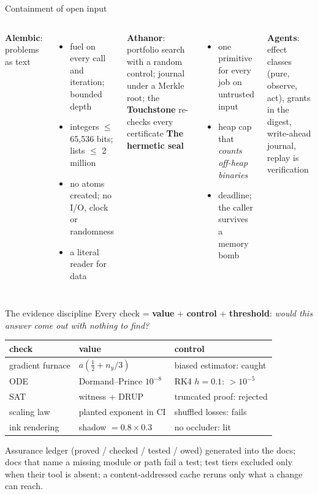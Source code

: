 \documentclass[aspectratio=169,11pt]{beamer}
\begin{document}
\begin{frame}{Containment of open input}
\begin{columns}[T]
\textbf{Alembic}: problems as text
\begin{itemize}\small
\item fuel on every call and iteration; bounded depth
\item integers $\le$ 65{,}536 bits; lists $\le$ 2 million
\item no atoms created; no I/O, clock or randomness
\item a literal reader for data
\end{itemize}
\textbf{Athanor}: portfolio search with a random control; journal under a Merkle root; the \textbf{Touchstone} re-checks every certificate
\textbf{The hermetic seal}
\begin{itemize}\small
\item one primitive for every job on untrusted input
\item heap cap that \emph{counts off-heap binaries}
\item deadline; the caller survives a memory bomb
\end{itemize}
\vspace{0.5em}
\textbf{Agents}: effect classes (pure, observe, act), grants in the digest, write-ahead journal, replay is verification
\end{columns}
\end{frame}

\begin{frame}{The evidence discipline}
\small
Every check = \textbf{value} + \textbf{control} + \textbf{threshold}: \emph{would this answer come out with nothing to find?}

\vspace{0.4em}
\begin{tabularx}{\linewidth}{@{}lXX@{}}
\toprule
check & value & control \\
\midrule
gradient furnace & $a(\frac12 + n_y/3)$ & biased estimator: caught \\
ODE & Dormand--Prince $10^{-8}$ & RK4 $h{=}0.1$: $>10^{-5}$ \\
SAT & witness + DRUP & truncated proof: rejected \\
scaling law & planted exponent in CI & shuffled losses: fails \\
ink rendering & shadow $= 0.8\times0.3$ & no occluder: lit \\
\bottomrule
\end{tabularx}

\vspace{0.5em}
Assurance ledger (proved / checked / tested / owed) generated into the docs; docs that name a missing module or path fail a test; test tiers excluded only when their tool is absent; a content-addressed cache reruns only what a change can reach.
\end{frame}
\end{document}
